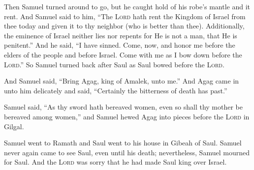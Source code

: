 \begin{inparaenum}
     Then Samuel turned around to go, but he caught hold of his robe's mantle and it rent.%
     And Samuel said to him, ``The \textsc{Lord} hath rent the Kingdom of Israel from thee today and given it to thy neighbor (who is better than thee).%
     Additionally, the eminence of Israel neither lies nor repents for He is not a man, that He is penitent.''%
     And he said, ``I have sinned. Come, now, and honor me before the elders of the people and before Israel. Come with me as I bow down before the \textsc{Lord}.''%
     So Samuel turned back after Saul as Saul bowed before the \textsc{Lord}.%
    
     And Samuel said, ``Bring Agag, king of Amalek, unto me.'' And Agag came in unto him delicately and said, ``Certainly the bitterness of death has past.''%
    
     Samuel said, ``As thy sword hath bereaved women, even so shall thy mother be bereaved among women,'' and Samuel hewed Agag into pieces before the \textsc{Lord} in Gilgal.%
    
     Samuel went to Ramath and Saul went to his house in Gibeah of Saul.%
     Samuel never again came to see Saul, even until his death; nevertheless, Samuel mourned for Saul. And the \textsc{Lord} was sorry that he had made Saul king over Israel.%
\end{inparaenum}
